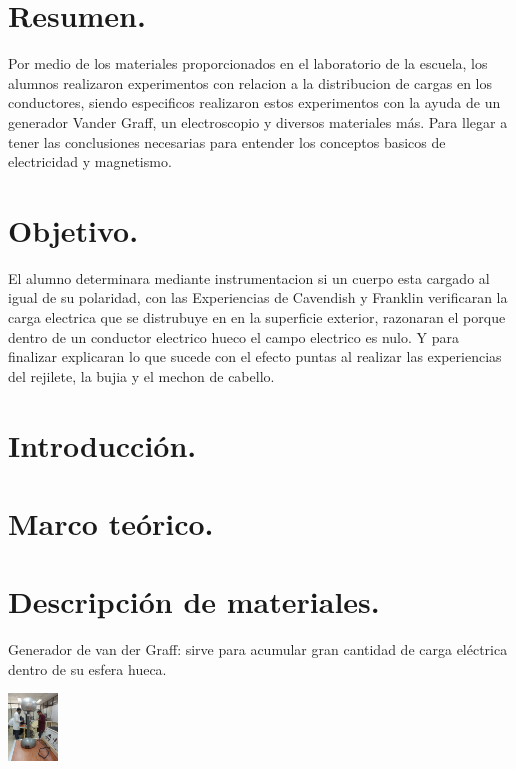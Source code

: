 \documentclass[10pt]{article}
\begin{document}
\tableofcontents
\newpage




\section{Resumen.}
Por medio de los materiales proporcionados en el laboratorio de la escuela, los alumnos realizaron experimentos con relacion a la distribucion de cargas en los conductores, siendo especificos realizaron estos experimentos con la ayuda de un generador Vander Graff, un electroscopio y diversos materiales más. Para llegar a tener las conclusiones necesarias para entender los conceptos basicos de electricidad y magnetismo.

\begin{multicols}{2}
\section{Objetivo.}
El alumno determinara mediante instrumentacion si un cuerpo esta cargado al igual de su polaridad, con las Experiencias de Cavendish y Franklin verificaran la carga electrica que se distrubuye en en la superficie exterior, razonaran el porque dentro de un conductor electrico hueco el campo electrico es nulo. Y para finalizar explicaran lo que sucede con el efecto puntas al realizar las experiencias del rejilete, la bujia y el mechon de cabello.

\section{Introducción.}



\section{Marco teórico.}



\section{Descripción de materiales.}

 Generador de van der Graff: sirve para acumular gran cantidad de carga eléctrica dentro de su esfera hueca.
 
\includegraphics[width=0.1\textwidth]{Vander} 
	

\end{multicols}
\end{document}
